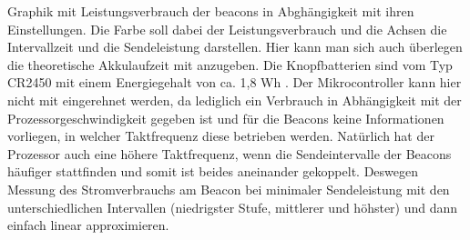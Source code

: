 Graphik mit Leistungsverbrauch der beacons in Abghängigkeit mit ihren Einstellungen. Die Farbe soll dabei der Leistungsverbrauch und die Achsen die Intervallzeit und die Sendeleistung darstellen. Hier kann man sich auch überlegen die theoretische Akkulaufzeit mit anzugeben. Die Knopfbatterien sind vom Typ CR2450 mit einem Energiegehalt von ca. 1,8 Wh \cite{CR2450}. Der Mikrocontroller kann hier nicht mit eingerehnet werden, da lediglich ein Verbrauch in Abhängigkeit mit der Prozessorgeschwindigkeit \cite{ARM} gegeben ist und für die Beacons keine Informationen vorliegen, in welcher Taktfrequenz diese betrieben werden. Natürlich hat der Prozessor auch eine höhere Taktfrequenz, wenn die Sendeintervalle der Beacons häufiger stattfinden und somit ist beides aneinander gekoppelt. Deswegen Messung des Stromverbrauchs am Beacon bei minimaler Sendeleistung mit den unterschiedlichen Intervallen (niedrigster Stufe, mittlerer und höhster) und dann einfach linear approximieren. 

    